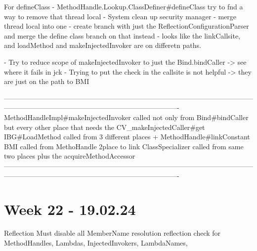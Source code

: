 For defineClass
- MethodHandle.Lookup.ClassDefiner#defineClass try to fnd a way to remove that thread local
- System clean up security manager
- merge thread local into one
- create branch with just the ReflectionConfigurationParser and merge the define class branch on that instead
- looks like the linkCallsite, and loadMethod and makeInjectedInvoker are on differetn paths.

- Try to reduce scope of makeInjectedInvoker to just the Bind.bindCaller -> see where it fails in jck
- Trying to put the check in the callsite is not helpful -> they are just on the path to BMI

----------------------------------------------------------------------------------------------------------------------------------------------------------------------------------------
MethodHandleImpl#makeInjectedInvoker called not only from Bind#bindCaller but every other place that needs the CV_makeInjectedCaller#get
 IBG#LoadMethod called from 3 different places + MethodHandle#linkConstant
 BMI called from MethoHandle 2place to link
 ClassSpecializer called from same two places plus the acquireMethodAccessor
----------------------------------------------------------------------------------------------------------------------------------------------------------------------------------------

\section{Week 22 - 19.02.24}

Reflection
Must disable all MemberName resolution reflection check for MethodHandles, Lambdas, InjectedInvokers, LambdaNames, 

